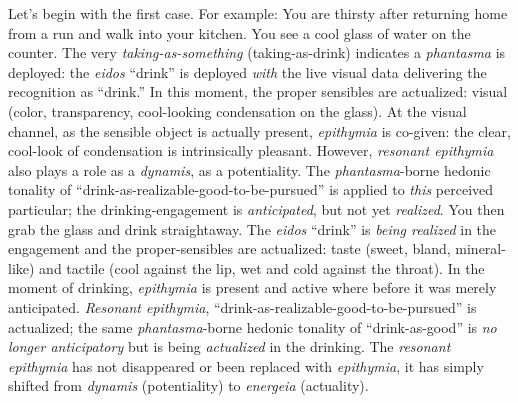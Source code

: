 Let's begin with the first case. For example: You are thirsty after returning home from a run and walk into your kitchen. You see a cool glass of water on the counter. The very \textit{taking-as-something} (taking-as-drink) indicates a \textit{phantasma} is deployed: the \textit{eidos} ``drink'' is deployed \textit{with} the live visual data delivering the recognition as ``drink.'' In this moment, the proper sensibles are actualized: visual (color, transparency, cool-looking condensation on the glass). At the visual channel, as the sensible object is actually present, \textit{epithymia} is co-given: the clear, cool-look of condensation is intrinsically pleasant. However, \textit{resonant epithymia} also plays a role as a \textit{dynamis}, as a potentiality. The \textit{phantasma}-borne hedonic tonality of ``drink-as-realizable-good-to-be-pursued'' is applied to \textit{this} perceived particular; the drinking-engagement is \textit{anticipated}, but not yet \textit{realized}. You then grab the glass and drink straightaway. The \textit{eidos} ``drink'' is \textit{being realized} in the engagement and the proper-sensibles are actualized: taste (sweet, bland, mineral-like) and tactile (cool against the lip, wet and cold against the throat). In the moment of drinking, \textit{epithymia} is present and active where before it was merely anticipated. \textit{Resonant epithymia}, ``drink-as-realizable-good-to-be-pursued'' is actualized; the same \textit{phantasma}-borne hedonic tonality of ``drink-as-good'' is \textit{no longer anticipatory} but is being \textit{actualized} in the drinking. The \textit{resonant epithymia} has not disappeared or been replaced with \textit{epithymia}, it has simply shifted from \textit{dynamis} (potentiality) to \textit{energeia} (actuality). 

